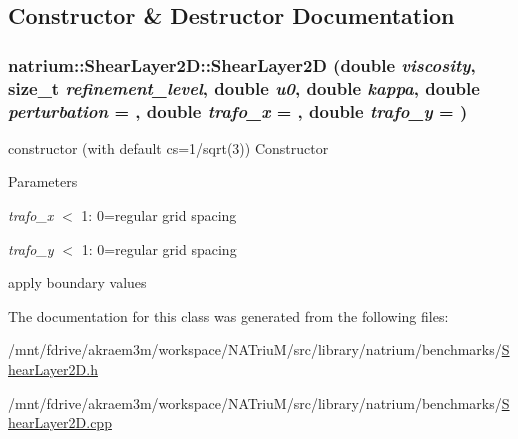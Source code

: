 \subsection{Constructor \& Destructor Documentation}
\hypertarget{classnatrium_1_1ShearLayer2D_a471304728fbf5bcae19f815d386e2f6c}{
\subsubsection[{ShearLayer2D}]{\setlength{\rightskip}{0pt plus 5cm}natrium::ShearLayer2D::ShearLayer2D (double {\em viscosity}, \/  size\_\-t {\em refinement\_\-level}, \/  double {\em u0}, \/  double {\em kappa}, \/  double {\em perturbation} = {}, \/  double {\em trafo\_\-x} = {}, \/  double {\em trafo\_\-y} = {})}}
\label{classnatrium_1_1ShearLayer2D_a471304728fbf5bcae19f815d386e2f6c}


constructor (with default cs=1/sqrt(3)) Constructor 
\begin{DoxyParams}{Parameters}
\item[{\em trafo\_\-x}]$<$ 1: 0=regular grid spacing \item[{\em trafo\_\-y}]$<$ 1: 0=regular grid spacing \end{DoxyParams}


apply boundary values 

The documentation for this class was generated from the following files:\begin{DoxyCompactItemize}
\item 
/mnt/fdrive/akraem3m/workspace/NATriuM/src/library/natrium/benchmarks/\hyperlink{ShearLayer2D_8h}{ShearLayer2D.h}\item 
/mnt/fdrive/akraem3m/workspace/NATriuM/src/library/natrium/benchmarks/\hyperlink{ShearLayer2D_8cpp}{ShearLayer2D.cpp}\end{DoxyCompactItemize}

